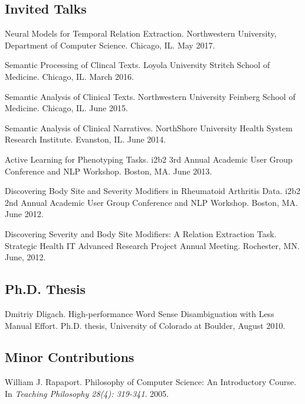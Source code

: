 \documentclass[letterpaper]{article}
\renewenvironment{itemize}{
  \begin{list}{}{
    \setlength{\leftmargin}{1.5em}
  }
}{
  \end{list}
}
\begin{document}
\subsection*{Invited Talks}
\begin{itemize}
\item Neural Models for Temporal Relation Extraction. Northwestern University, Department of Computer Science. Chicago, IL. May 2017.
\item Semantic Processing of Clincal Texts. Loyola University Stritch School of Medicine. Chicago, IL. March 2016.
\item Semantic Analysis of Clinical Texts. Northwestern University Feinberg School of Medicine. Chicago, IL. June 2015.
\item Semantic Analysis of Clinical Narratives. NorthShore University Health System Research Institute. Evanston, IL. June 2014.
\item Active Learning for Phenotyping Tasks. i2b2 3rd Annual Academic User Group Conference and NLP Workshop. Boston, MA. June 2013.
\item Discovering Body Site and Severity Modifiers in Rheumatoid Arthritis Data. i2b2 2nd Annual Academic User Group Conference and NLP Workshop. Boston, MA. June 2012.
\item Discovering Severity and Body Site Modifiers: A Relation Extraction Task. Strategic Health IT Advanced Research Project Annual Meeting. Rochester, MN. June, 2012.
\end{itemize}

\subsection*{Ph.D. Thesis}
\begin{itemize}
\item Dmitriy Dligach. High-performance Word Sense Disambiguation with Less Manual Effort. Ph.D. thesis, University of Colorado at Boulder, August 2010.
\end{itemize}

\subsection*{Minor Contributions}
\begin{itemize}
\item William J. Rapaport. Philosophy of Computer Science: An Introductory Course. In \emph {Teaching Philosophy 28(4): 319-341}. 2005.
\end{itemize}
\end{document}
